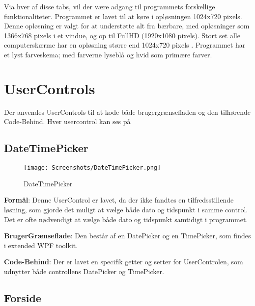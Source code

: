 Via hver af disse tabs, vil der være adgang til programmets forskellige funktionaliteter.
Programmet er lavet til at køre i opløsningen 1024x720 pixels.
Denne opløsning er valgt for at understøtte alt fra bærbare, med opløsninger som 1366x768 pixels i et vindue, og op til FullHD (1920x1080 pixels).
Stort set alle computerskærme har en opløsning større end 1024x720 pixels \citep{resolutions}. 
Programmet har et lyst farveskema; med farverne lyseblå og hvid som primære farver.

\section{UserControls}
Der anvendes UserControls til at kode både brugergrænsefladen og den tilhørende Code-Behind.
Hver usercontrol kan ses på 

\subsection{DateTimePicker}\label{subsec:DateTimePicker}

\begin{wrapfigure}{r}{0.5\textwidth}
    \label{img:DateTimePicker}
    \vspace{-20pt}
    \begin{center}
        \texttt{[image: Screenshots/DateTimePicker.png]}
    \end{center}
    \vspace{-15pt}
    \caption{DateTimePicker}
    \vspace{-30pt}
\end{wrapfigure}

\textbf{Formål}: 
Denne UserControl er lavet, da der ikke fandtes en tilfredsstillende løsning, som gjorde det muligt at vælge både dato og tidspunkt i samme control. 
Det er ofte nødvendigt at vælge både dato og tidspunkt samtidigt i programmet. 

\textbf{BrugerGrænseflade}: 
Den består af en DatePicker og en TimePicker, som findes i extended WPF toolkit.

\textbf{Code-Behind}: 
Der er lavet en specifik getter og setter for UserControlen, som udnytter både controllens DatePicker og TimePicker.


\subsection{Forside}


